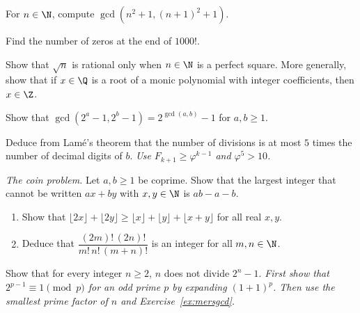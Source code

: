 \begin{exercise}[$\star$]\label{ex:gcdn}
For $n\in\N$, compute $\gcd\left(n^2+1,(n+1)^2+1\right)$.
\end{exercise}

\begin{exercise}[$\star$]\label{ex:zeros}
Find the number of zeros at the end of $1000!$.
\end{exercise}

\begin{exercise}[$\star\star$]\label{ex:sqrt}
Show that $\sqrt n$ is rational only when $n\in\N$ is a perfect square. More generally, show that if $x\in\Q$ is a root of a monic polynomial with integer coefficients, then $x\in\Z$.
\end{exercise}

\begin{exercise}[$\star\star$]\label{ex:mersgcd}
Show that $\gcd\left(2^a-1,2^b-1\right)=2^{\gcd(a,b)}-1$ for $a,b\ge1$.
\end{exercise}

\begin{exercise}[$\star\star$]\label{ex:lame5}
Deduce from Lam\'e's theorem that the number of divisions is at most $5$ times the number of decimal digits of $b$.
\emph{Use $F_{k+1}\ge\varphi^{k-1}$ and $\varphi^5>10$.}
\end{exercise}

\begin{exercise}[$\star\star$]\label{ex:frob}
\emph{The coin problem.} Let $a,b\ge1$ be coprime. Show that the largest integer that cannot be written $ax+by$ with $x,y\in\N$ is $ab-a-b$.
\end{exercise}

\begin{exercise}[$\star\star\star$]\label{ex:supercat}
\begin{enumerate}[label=(\alph*)]
\item Show that $\lfloor2x\rfloor+\lfloor2y\rfloor\ge\lfloor x\rfloor+\lfloor y\rfloor+\lfloor x+y\rfloor$ for all real $x,y$.
\item Deduce that $\dfrac{(2m)!\,(2n)!}{m!\,n!\,(m+n)!}$ is an integer for all $m,n\in\N$.
\end{enumerate}
\end{exercise}

\begin{exercise}[$\star\star\star$]\label{ex:n2n}
Show that for every integer $n\ge2$, $n$ does not divide $2^n-1$. \emph{First show that $2^{p-1}\equiv1\pmod p$ for an odd prime $p$ by expanding $(1+1)^p$. Then use the smallest prime factor of $n$ and Exercise~\ref{ex:mersgcd}.}
\end{exercise}

